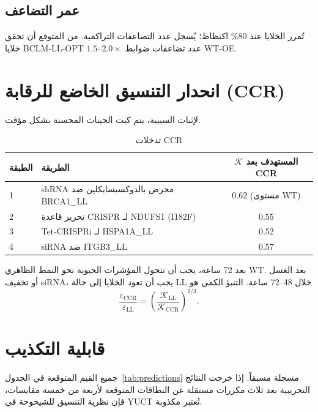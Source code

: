 \documentclass[11pt,a4paper]{article}
\newcommand{\REL}{\mathcal{K}}          %
\begin{document}
	\subsection{عمر التضاعف}
	تُمرر الخلايا عند 80\% اكتظاظ؛ يُسجل عدد التضاعفات التراكمية. من المتوقع أن تحقق خلايا BCLM‑LL‑OPT \(1.5\)–\(2.0\times\) عدد تضاعفات ضوابط WT‑OE.
	
	\section{انحدار التنسيق الخاضع للرقابة (CCR)}
	\label{sec:CCR}
	لإثبات السببية، يتم كبت الجينات المحسنة بشكل مؤقت.
	
	\begin{table}[H]
		\centering
		\caption{تدخلات CCR}
		\label{tab:CCR}
		\begin{tabular}{@{}llc@{}}
			\toprule
			\textbf{الطبقة} & \textbf{الطريقة} & \textbf{\(\REL\) المستهدف بعد CCR} \\
			\midrule
			1 & shRNA محرض بالدوكسيسايكلين ضد BRCA1\_LL & 0.62 (مستوى WT) \\
			2 & تحرير قاعدة CRISPR لـ NDUFS1 (I182F)   & 0.55 \\
			3 & Tet‑CRISPRi لـ HSPA1A\_LL               & 0.52 \\
			4 & siRNA ضد ITGB3\_LL                      & 0.57 \\
			\bottomrule
		\end{tabular}
	\end{table}
	
	بعد 72 ساعة، يجب أن تتحول المؤشرات الحيوية نحو النمط الظاهري WT. بعد الغسل أو تخفيف siRNA، يجب أن تعود الخلايا إلى حالة LL خلال 48–72 ساعة. التنبؤ الكمي هو
	\[
	\frac{\varepsilon_{\mathrm{CCR}}}{\varepsilon_{\mathrm{LL}}} = \left(\frac{\REL_{\mathrm{LL}}}{\REL_{\mathrm{CCR}}}\right)^{2/3}.
	\]
	
	\section{قابلية التكذيب}
	\label{sec:falsifiability}
	جميع القيم المتوقعة في الجدول~\ref{tab:predictions} مسجلة مسبقاً. إذا خرجت النتائج التجريبية بعد ثلاث مكررات مستقلة عن النطاقات المتوقعة لأربعة من خمسة مقايسات، فإن نظرية التنسيق للشيخوخة في YUCT تُعتبر مكذوبة.
	
\end{document}

